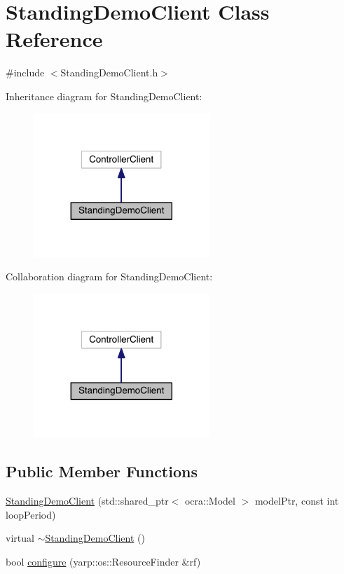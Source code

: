 \hypertarget{classStandingDemoClient}{}\section{Standing\+Demo\+Client Class Reference}
\label{classStandingDemoClient}


{\ttfamily \#include $<$Standing\+Demo\+Client.\+h$>$}



Inheritance diagram for Standing\+Demo\+Client\+:
\nopagebreak
\begin{figure}[H]
\begin{center}
\leavevmode
\includegraphics[width=188pt]{classStandingDemoClient__inherit__graph}
\end{center}
\end{figure}


Collaboration diagram for Standing\+Demo\+Client\+:
\nopagebreak
\begin{figure}[H]
\begin{center}
\leavevmode
\includegraphics[width=188pt]{classStandingDemoClient__coll__graph}
\end{center}
\end{figure}
\subsection*{Public Member Functions}
\begin{DoxyCompactItemize}
\item 
\hyperlink{classStandingDemoClient_a7fc81439cf274825e81f243fab4ee94a}{Standing\+Demo\+Client} (std\+::shared\+\_\+ptr$<$ ocra\+::\+Model $>$ model\+Ptr, const int loop\+Period)
\item 
virtual \hyperlink{classStandingDemoClient_a36afdcb86f9e304c53f9903d6b286dd7}{$\sim$\+Standing\+Demo\+Client} ()
\item 
bool \hyperlink{classStandingDemoClient_a9cca697399c183d9e2e5fe5b45dbc815}{configure} (yarp\+::os\+::\+Resource\+Finder \&rf)
\end{DoxyCompactItemize}
